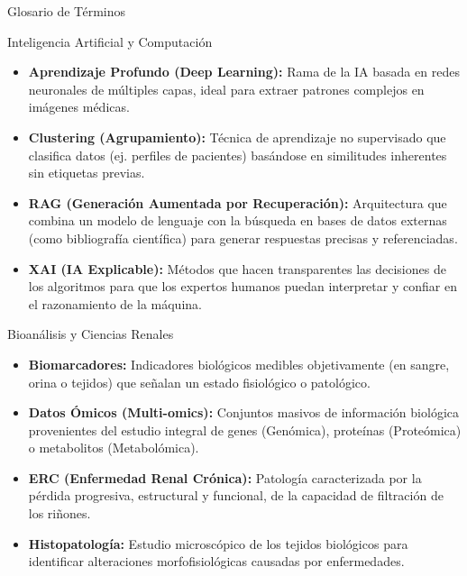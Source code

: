 \documentclass[12pt,letterpaper]{article}
\begin{document}
\begin{infobox}[colframe=secondarycolor, colback=lightbg]{Glosario de Términos}
    
    \begin{subbox}{Inteligencia Artificial y Computación}
    \begin{itemize}[leftmargin=*, label=\textcolor{secondarycolor}{\textbullet}]
        \item \textbf{Aprendizaje Profundo (Deep Learning):} Rama de la IA basada en redes neuronales de múltiples capas, ideal para extraer patrones complejos en imágenes médicas.
        \item \textbf{Clustering (Agrupamiento):} Técnica de aprendizaje no supervisado que clasifica datos (ej. perfiles de pacientes) basándose en similitudes inherentes sin etiquetas previas.
        \item \textbf{RAG (Generación Aumentada por Recuperación):} Arquitectura que combina un modelo de lenguaje con la búsqueda en bases de datos externas (como bibliografía científica) para generar respuestas precisas y referenciadas.
        \item \textbf{XAI (IA Explicable):} Métodos que hacen transparentes las decisiones de los algoritmos para que los expertos humanos puedan interpretar y confiar en el razonamiento de la máquina.
    \end{itemize}
    \end{subbox}

    \vspace{0.2cm}

    \begin{subbox}{Bioanálisis y Ciencias Renales}
    \begin{itemize}[leftmargin=*, label=\textcolor{secondarycolor}{\textbullet}]
        \item \textbf{Biomarcadores:} Indicadores biológicos medibles objetivamente (en sangre, orina o tejidos) que señalan un estado fisiológico o patológico.
        \item \textbf{Datos Ómicos (Multi-omics):} Conjuntos masivos de información biológica provenientes del estudio integral de genes (Genómica), proteínas (Proteómica) o metabolitos (Metabolómica).
        \item \textbf{ERC (Enfermedad Renal Crónica):} Patología caracterizada por la pérdida progresiva, estructural y funcional, de la capacidad de filtración de los riñones.
        \item \textbf{Histopatología:} Estudio microscópico de los tejidos biológicos para identificar alteraciones morfofisiológicas causadas por enfermedades.
    \end{itemize}
    \end{subbox}

\end{infobox}
\end{document}
